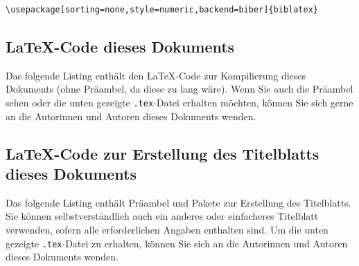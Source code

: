 \begin{lstlisting}
\usepackage[sorting=none,style=numeric,backend=biber]{biblatex}
\end{lstlisting}

\subsection{\LaTeX{}-Code dieses Dokuments}
Das folgende Listing enthält den \LaTeX{}-Code zur Kompilierung dieses Dokuments (ohne Präambel, da diese zu lang wäre). Wenn Sie auch die Präambel sehen oder die unten gezeigte \texttt{.tex}-Datei erhalten möchten, können Sie sich gerne an die Autorinnen und Autoren dieses Dokuments wenden.


\subsection{\LaTeX{}-Code zur Erstellung des Titelblatts dieses Dokuments}
Das folgende Listing enthält Präambel und Pakete zur Erstellung des Titelblatts. Sie können selbstverständlich auch ein anderes oder einfacheres Titelblatt verwenden, sofern alle erforderlichen Angaben enthalten sind. Um die unten gezeigte \texttt{.tex}-Datei zu erhalten, können Sie sich an die Autorinnen und Autoren dieses Dokuments wenden.

% 

\newpage
\printbibliography

\newpage
\printglossaries
